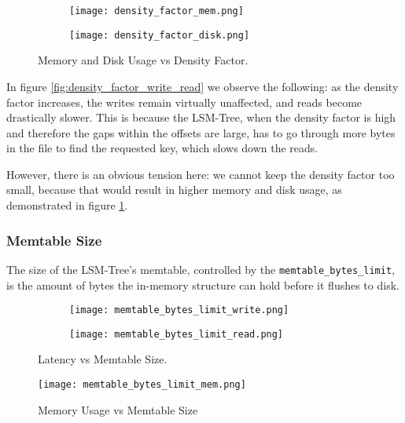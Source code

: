 \begin{figure}[H]
    \begin{subfigure}{.5\textwidth}
        \centering
        \texttt{[image: density\_factor\_mem.png]}
    \end{subfigure}
    \begin{subfigure}{.5\textwidth}
        \centering
        \texttt{[image: density\_factor\_disk.png]}
    \end{subfigure}
    \caption{Memory and Disk Usage vs Density Factor.}
    \label{fig:density_factor_mem_disk}
\end{figure}

In figure \ref{fig:density_factor_write_read} we observe the following: as the density factor increases, the writes remain virtually unaffected, and reads become drastically slower. This is because the LSM-Tree, when the density factor is high and therefore the gaps within the offsets are large, has to go through more bytes in the file to find the requested key, which slows down the reads.

However, there is an obvious tension here: we cannot keep the density factor too small, because that would result in higher memory and disk usage, as demonstrated in figure \ref{fig:density_factor_mem_disk}.

\subsubsection{Memtable Size}

The size of the LSM-Tree's memtable, controlled by the \verb"memtable_bytes_limit", is the amount of bytes the in-memory structure can hold before it flushes to disk.

\begin{figure}[H]
    \begin{subfigure}{.5\textwidth}
        \centering
        \texttt{[image: memtable\_bytes\_limit\_write.png]}
    \end{subfigure}
    \begin{subfigure}{.5\textwidth}
        \centering
        \texttt{[image: memtable\_bytes\_limit\_read.png]}
    \end{subfigure}
    \caption{Latency vs Memtable Size.}
    \label{fig:memtable-bytes-limit-write-read}
\end{figure}

\begin{figure}[H]
    \centering
    \texttt{[image: memtable\_bytes\_limit\_mem.png]}
    \caption{Memory Usage vs Memtable Size}
    \label{fig:memtable_bytes_limit_mem}
\end{figure}

